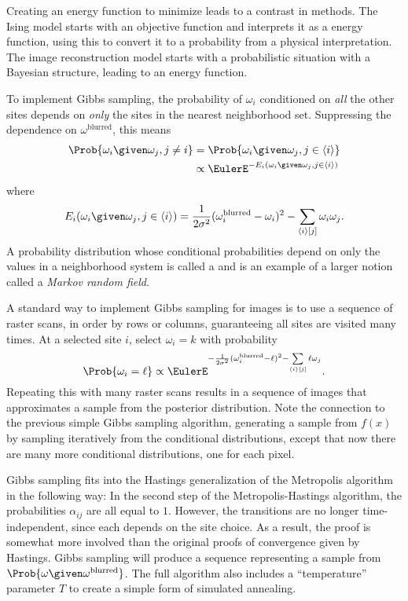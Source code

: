 \documentclass[12pt]{article}
\begin{document}
Creating an energy function to minimize leads to a contrast in methods.
The Ising model starts with an objective function and interprets it as a
energy function, using this to convert it to a probability from a
physical interpretation.  The image reconstruction model starts with a
probabilistic situation with a Bayesian structure, leading to an energy
function.

To implement Gibbs sampling, the probability of \( \omega_i \)
conditioned on \emph{all} the other sites depends on \emph{only} the
sites in the nearest neighborhood set.  Suppressing the dependence on \(
\omega^{\text {blurred}} \), this means
\begin{align*}
    \Prob{\omega_i \given \omega_j, j \ne i } &= \Prob { \omega_i \given
    \omega_j, j \in \langle i \rangle } \\
    & \propto \EulerE^{-E_i(\omega_i \given \omega_j, j \in \langle i
    \rangle)}
\end{align*}
where
\[
    E_i(\omega_i \given \omega_j, j \in \langle i\rangle) = \frac{1}{2\sigma^2}
    (\omega_i^{\text{blurred}}-\omega_i)^2 - \sum\limits_{\langle i
    \rangle[j]} \omega_i\omega_j.
\] A probability distribution whose conditional probabilities depend on
only the values in a neighborhood system is called a %
and is an example of a larger notion called a \emph{Markov random field}.%

A standard way to implement Gibbs sampling for images is to use a
sequence of raster scans, in order by rows or columns, guaranteeing all
sites are visited many times.  At a selected site \( i \), select \(
\omega_i = k \) with probability
\[
    \Prob{\omega_i = \ell} \propto \EulerE^{-\frac{1}{2\sigma^2}(\omega_i^
    {\text {blurred}}-\ell)^2 - \sum\limits_{\langle i \rangle [j]} \ell
    \omega_j}.
\] Repeating this with many raster scans results in a sequence of images
that approximates a sample from the posterior distribution.  Note the
connection to the previous simple Gibbs sampling algorithm, generating a
sample from \( f(x) \) by sampling iteratively from the conditional
distributions, except that now there are many more conditional
distributions, one for each pixel.

Gibbs sampling fits into the Hastings generalization of the Metropolis
algorithm in the following way:  In the second step of the
Metropolis-Hastings algorithm, the probabilities \( \alpha_{ij} \) are
all equal to \( 1 \).  However, the transitions are no longer
time-independent, since each depends on the site choice.  As a result,
the proof is somewhat more involved than the original proofs of
convergence given by Hastings.  Gibbs sampling will produce a sequence
representing a sample from \( \Prob{\omega \given \omega^{\text{blurred}}}
\).  The full algorithm also includes a ``temperature'' parameter \( T \)
to create a simple form of simulated annealing.
\end{document}
